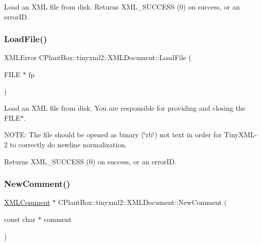 Load an X\+ML file from disk. Returns X\+M\+L\+\_\+\+S\+U\+C\+C\+E\+SS (0) on success, or an error\+ID. \mbox{\label{classCPlantBox_1_1tinyxml2_1_1XMLDocument_ac569059c86b1a4305b76a96f9cbb2aac}} 
\subsubsection{\texorpdfstring{Load\+File()}{LoadFile()}\hspace{0.1cm}{\footnotesize\ttfamily [2/2]}}
{\footnotesize\ttfamily X\+M\+L\+Error C\+Plant\+Box\+::tinyxml2\+::\+X\+M\+L\+Document\+::\+Load\+File (\begin{DoxyParamCaption}\item[{F\+I\+LE $\ast$}]{fp }\end{DoxyParamCaption})}

Load an X\+ML file from disk. You are responsible for providing and closing the F\+I\+L\+E$\ast$.

N\+O\+TE\+: The file should be opened as binary (\char`\"{}rb\char`\"{}) not text in order for Tiny\+X\+M\+L-\/2 to correctly do newline normalization.

Returns X\+M\+L\+\_\+\+S\+U\+C\+C\+E\+SS (0) on success, or an error\+ID. \mbox{\label{classCPlantBox_1_1tinyxml2_1_1XMLDocument_a95bf156380454e620d1dc5f2b729dbc8}} 
\subsubsection{\texorpdfstring{New\+Comment()}{NewComment()}}
{\footnotesize\ttfamily \hyperlink{classCPlantBox_1_1tinyxml2_1_1XMLComment}{X\+M\+L\+Comment} $\ast$ C\+Plant\+Box\+::tinyxml2\+::\+X\+M\+L\+Document\+::\+New\+Comment (\begin{DoxyParamCaption}\item[{const char $\ast$}]{comment }\end{DoxyParamCaption})}

